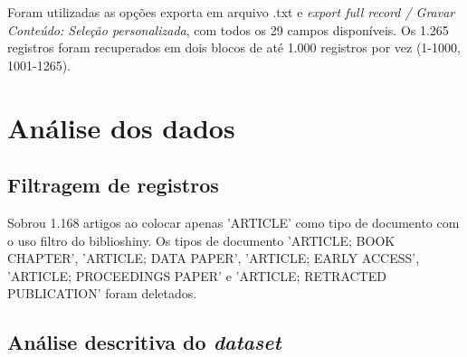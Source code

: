 Foram utilizadas as opções exporta em arquivo .txt e \textit{export full record / Gravar Conteúdo: Seleção personalizada}, com todos os 29 campos disponíveis. Os 1.265 registros foram recuperados em dois blocos de até 1.000 registros por vez (1-1000, 1001-1265).

\section{Análise dos dados}

\subsection{Filtragem de registros}

Sobrou 1.168 artigos ao colocar apenas 'ARTICLE' como tipo de documento com o uso filtro do biblioshiny. Os tipos de documento 'ARTICLE; BOOK CHAPTER', 'ARTICLE; DATA PAPER', 'ARTICLE; EARLY ACCESS', 'ARTICLE; PROCEEDINGS PAPER' e 'ARTICLE; RETRACTED PUBLICATION' foram deletados.



\subsection{Análise descritiva do \textit{dataset}} 


